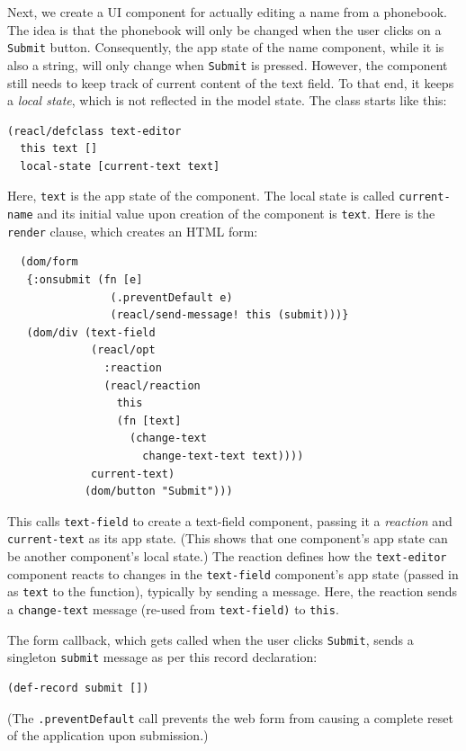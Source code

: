 \documentclass[sigplan,review,screen]{acmart}
\begin{document}
Next, we create a UI component for actually editing a name from a
phonebook.  The idea is that the phonebook will only be changed when
the user clicks on a \texttt{Submit} button.  Consequently, the app
state of the name component, while it is also a string, will only
change when \texttt{Submit} is pressed.  However, the component still
needs to keep track of current content of the text field.  To that
end, it keeps a \textit{local state}, which is not reflected in the
model state.  The class starts like this:
%
\begin{verbatim}
(reacl/defclass text-editor
  this text []
  local-state [current-text text]
\end{verbatim}
%
Here, \texttt{text} is the app state of the component.  The local
state is called \texttt{current-name} and its initial value upon
creation of the component is \texttt{text}.  Here is the
\texttt{render} clause, which creates an HTML form:
%
\begin{verbatim}
  (dom/form
   {:onsubmit (fn [e]
                (.preventDefault e)
                (reacl/send-message! this (submit)))}
   (dom/div (text-field
             (reacl/opt
               :reaction
               (reacl/reaction
                 this
                 (fn [text]
                   (change-text
                     change-text-text text))))
             current-text)
            (dom/button "Submit")))
\end{verbatim}
%
This calls \texttt{text-field} to create a text-field component,
passing it a \textit{reaction} and \texttt{current-text} as its app
state.  (This shows that one component's app state can be another
component's local state.)  The reaction defines how the
\texttt{text-editor} component reacts to changes in the
\texttt{text-field} component's app state (passed in as \texttt{text}
to the function), typically by sending a message.  Here, the reaction
sends a \texttt{change-text} message (re-used from
\texttt{text-field)} to \texttt{this}.

The form callback, which gets called when the user clicks
\texttt{Submit}, sends a singleton \texttt{submit} message as per this
record declaration:
%
\begin{verbatim}
(def-record submit [])
\end{verbatim}
%
(The \texttt{.preventDefault} call prevents the web form from causing
a complete reset of the application upon submission.)
\end{document}
